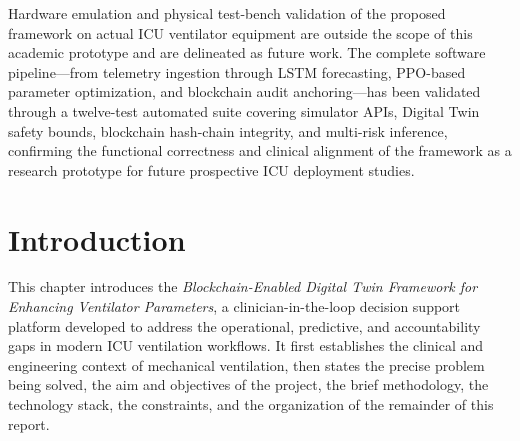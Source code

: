 \documentclass[12pt,a4paper,oneside]{report}
\begin{document}
Hardware emulation and physical test-bench validation of the proposed framework on actual ICU ventilator equipment are outside the scope of this academic prototype and are delineated as future work. The complete software pipeline—from telemetry ingestion through LSTM forecasting, PPO-based parameter optimization, and blockchain audit anchoring—has been validated through a twelve-test automated suite covering simulator APIs, Digital Twin safety bounds, blockchain hash-chain integrity, and multi-risk inference, confirming the functional correctness and clinical alignment of the framework as a research prototype for future prospective ICU deployment studies.

\newpage

\renewcommand{\contentsname}{\centering CONTENTS}
\tableofcontents
\newpage

\renewcommand{\listfigurename}{\centering LIST OF FIGURES}
\listoffigures
\newpage

\renewcommand{\listtablename}{\centering LIST OF TABLES}
\listoftables
\newpage

\setcounter{page}{1}

\chapter{Introduction}

This chapter introduces the \textit{Blockchain-Enabled Digital Twin Framework for Enhancing Ventilator Parameters}, a clinician-in-the-loop decision support platform developed to address the operational, predictive, and accountability gaps in modern ICU ventilation workflows. It first establishes the clinical and engineering context of mechanical ventilation, then states the precise problem being solved, the aim and objectives of the project, the brief methodology, the technology stack, the constraints, and the organization of the remainder of this report.
\end{document}
